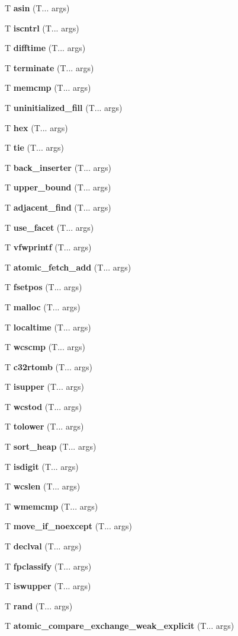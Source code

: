 \begin{DoxyCompactItemize}
T \textbf{ asin} (T... args)
\item 
T \textbf{ iscntrl} (T... args)
\item 
T \textbf{ difftime} (T... args)
\item 
T \textbf{ terminate} (T... args)
\item 
T \textbf{ memcmp} (T... args)
\item 
T \textbf{ uninitialized\+\_\+fill} (T... args)
\item 
T \textbf{ hex} (T... args)
\item 
T \textbf{ tie} (T... args)
\item 
T \textbf{ back\+\_\+inserter} (T... args)
\item 
T \textbf{ upper\+\_\+bound} (T... args)
\item 
T \textbf{ adjacent\+\_\+find} (T... args)
\item 
T \textbf{ use\+\_\+facet} (T... args)
\item 
T \textbf{ vfwprintf} (T... args)
\item 
T \textbf{ atomic\+\_\+fetch\+\_\+add} (T... args)
\item 
T \textbf{ fsetpos} (T... args)
\item 
T \textbf{ malloc} (T... args)
\item 
T \textbf{ localtime} (T... args)
\item 
T \textbf{ wcscmp} (T... args)
\item 
T \textbf{ c32rtomb} (T... args)
\item 
T \textbf{ isupper} (T... args)
\item 
T \textbf{ wcstod} (T... args)
\item 
T \textbf{ tolower} (T... args)
\item 
T \textbf{ sort\+\_\+heap} (T... args)
\item 
T \textbf{ isdigit} (T... args)
\item 
T \textbf{ wcslen} (T... args)
\item 
T \textbf{ wmemcmp} (T... args)
\item 
T \textbf{ move\+\_\+if\+\_\+noexcept} (T... args)
\item 
T \textbf{ declval} (T... args)
\item 
T \textbf{ fpclassify} (T... args)
\item 
T \textbf{ iswupper} (T... args)
\item 
T \textbf{ rand} (T... args)
\item 
T \textbf{ atomic\+\_\+compare\+\_\+exchange\+\_\+weak\+\_\+explicit} (T... args)

\end{DoxyCompactItemize}
